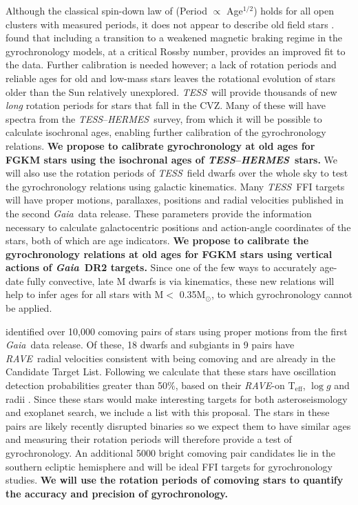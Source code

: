 \documentclass[letterpaper,12pt,preprint]{hack_aastex}
\newcommand{\TESS}{{\it TESS}}
\newcommand{\tess}{{\it TESS}}
\newcommand{\Gaia}{{\it Gaia}}
\newcommand{\RAVE}{{\it RAVE}}
\newcommand{\hermes}{{\it HERMES}}
\newcommand{\HERMES}{{\it HERMES}}
\begin{document}
Although the classical spin-down law of \citet{skumanich1972} (Period
$\propto$ Age$^{1/2}$) holds for all open clusters with measured periods, it
does not appear to describe old field stars \citep{angus2015, van-saders2016}.
\citet{van-saders2016} found that including a transition to a weakened magnetic
braking regime in the gyrochronology models, at a critical Rossby number,
provides an improved fit to the data.
Further calibration is needed however; a lack of rotation periods and reliable
ages for old and low-mass stars leaves the rotational evolution of stars older
than the Sun relatively unexplored.
\TESS\ will provide thousands of new {\it long } rotation periods for stars
that fall in the CVZ.
Many of these will have spectra from the \TESS --\HERMES\ survey, from which
it will be possible to calculate isochronal ages, enabling further calibration
of the gyrochronology relations.
{\bf We propose to calibrate gyrochronology at old ages for FGKM stars using
the isochronal ages of \TESS--\hermes\ stars.}
We will also use the rotation periods of \TESS\ field dwarfs over the whole sky
to test the gyrochronology relations using galactic kinematics.
Many \tess\ FFI targets will have proper motions, parallaxes, positions and
radial velocities published in the second \Gaia\ data release.
These parameters provide the information necessary to calculate galactocentric
positions and action-angle coordinates of the stars, both of which are age
indicators.
{\bf We propose to calibrate the gyrochronology relations at old ages for FGKM
stars using vertical actions of \Gaia\ DR2 targets.}
Since one of the few ways to accurately age-date fully convective, late M
dwarfs is via kinematics, these new relations will help to infer ages for all
stars with M$<$ 0.35M$_\odot$, to which gyrochronology cannot be applied.

\citet{oh2016} identified over 10,000 comoving pairs of stars using proper
motions from the first \Gaia\ data release.
Of these, 18 dwarfs and subgiants in 9 pairs have \RAVE\ radial velocities
consistent with being comoving and are already in the Candidate Target List.
Following \citet{campante2016} we calculate that these stars have oscillation
detection probabilities greater than 50\%, based on their \RAVE-on
T$_{\mathrm{eff}}$, $\log g$ and radii \citep{casey2017}.
Since these stars would make interesting targets for both asteroseismology and
exoplanet search, we include a list with this proposal.
The stars in these pairs are likely recently disrupted binaries so we
expect them to have similar ages and measuring their rotation periods will
therefore provide a test of gyrochronology.
An additional 5000 bright comoving pair candidates lie in the southern
ecliptic hemisphere and will be ideal FFI targets for gyrochronology studies.
{\bf We will use the rotation periods of comoving stars to quantify the
accuracy and precision of gyrochronology.}
\end{document}
